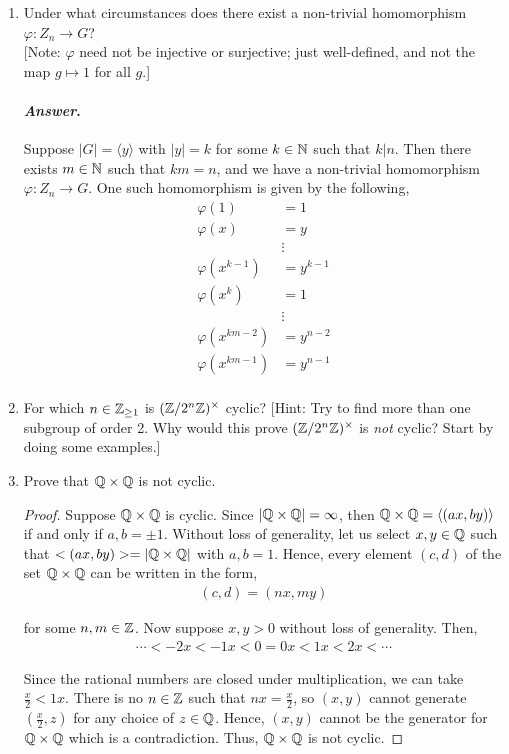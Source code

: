 \documentclass[11pt, reqno]{amsart}
\theoremstyle{plain}
\theoremstyle{definition}
\theoremstyle{example}
\newenvironment{ans}{\color{black}\medskip \paragraph*{\emph{Answer}.}}{\hfill \break  $~\!\!$ \dotfill \medskip }
\def\<{\langle} \def\>{\rangle}
\def\f{\varphi}
\begin{document}
\begin{enumerate}[1.]
\begin{enumerate}
\begin{proof}
Suppose that $\sigma_a$ is an automorphism of $Z_n$ and suppose $(a, n) = k \neq 1$.
\end{proof}
\item Under what circumstances does there exist a non-trivial homomorphism $\f: Z_n \to G$? \\{\small[Note: $\f$ need not be injective or surjective; just well-defined, and not the map $g \mapsto 1$ for all $g$.]}
\begin{ans}
Suppose $|G| = \<y\>$ with $|y| = k$ for some $k \in \mathbb{N}$ such that $k | n$. Then there exists $m \in \mathbb{N}$ such that $km = n$, and we have a non-trivial homomorphism $\varphi: Z_n \to G$. One such homomorphism is given by the following,
\begin{align*}
\varphi(1) &= 1\\
\varphi(x) &= y\\
&\vdots\\
\varphi(x^{k-1}) &= y^{k-1}\\
\varphi(x^k) &= 1\\
&\vdots\\
\varphi(x^{km-2}) &= y^{n-2}\\
\varphi(x^{km-1}) &= y^{n-1}\\
\end{align*}
\end{ans}

\item For which $n \in \mathbb{Z}_{\ge 1}$ is $(\mathbb{Z}/2^n\mathbb{Z})^\times$ cyclic? \hfill {\small[Hint: Try to find more than one subgroup of order 2. Why would this prove $(\mathbb{Z}/2^n\mathbb{Z})^\times$ is \emph{not} cyclic? Start by doing some examples.]}
\item Prove that $\mathbb{Q} \times \mathbb{Q}$ is not cyclic.
\begin{proof}
Suppose $\mathbb{Q} \times \mathbb{Q}$ is cyclic. Since $|\mathbb{Q} \times \mathbb{Q}| = \infty$, then $\QQ \times \QQ = \<(ax, by)\>$ if and only if $a, b = \pm 1$. Without loss of generality, let us select $x, y \in \mathbb{Q}$ such that $<(ax, by)> = |\mathbb{Q} \times \mathbb{Q}|$ with $a, b = 1$. Hence, every element $(c, d)$ of the set $\mathbb{Q} \times \mathbb{Q}$ can be written in the form,
\begin{align*}
(c, d) = (nx, my)
\end{align*}

for some $n, m \in \mathbb{Z}$. Now suppose $x, y > 0$ without loss of generality. Then,
\begin{align*}
\cdots < -2x < -1x < 0 = 0x < 1x < 2x < \cdots 
\end{align*}

Since the rational numbers are closed under multiplication, we can take $\frac{x}{2} < 1x$. There is no $n \in \mathbb{Z}$ such that $nx = \frac{x}{2}$, so $(x, y)$ cannot generate $(\frac{x}{2}, z)$ for any choice of $z \in \mathbb{Q}$. Hence, $(x, y)$ cannot be the generator for $\mathbb{Q} \times \mathbb{Q}$ which is a contradiction. Thus, $\mathbb{Q} \times \mathbb{Q}$ is not cyclic.
\end{proof}
\end{enumerate}


\end{enumerate}
\end{document}
